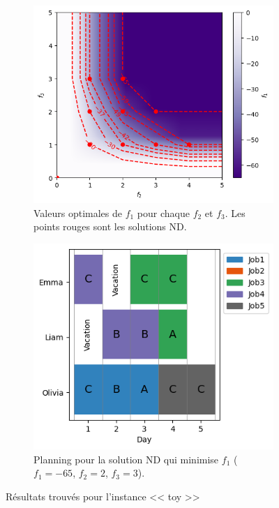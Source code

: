 \documentclass[12pt, a4paper, french, version=last, parskip=half, titlepage]{scrartcl}
\begin{document}
\begin{figure}[H]
    \begin{subfigure}[t]{0.49\textwidth}
        \centering
        \includegraphics[width=\textwidth]{images/plot_toy_nd.png}
        \caption{Valeurs optimales de $f_1$ pour chaque $f_2$ et $f_3$. Les points rouges sont les solutions ND.}
        \label{fig:toy-nd}
    \end{subfigure}
    \hfill
    \begin{subfigure}[t]{0.49\textwidth}
        \centering
        \includegraphics[width=\textwidth]{images/plot_toy_planning.png}
        \caption{Planning pour la solution ND qui minimise $f_1$ ($f_1=-65$, $f_2=2$, $f_3=3$).}
        \label{fig:toy-planning}
    \end{subfigure}
    \caption{Résultats trouvés pour l'instance << toy >>}
    \label{fig:toy}
\end{figure}    
\end{document}
